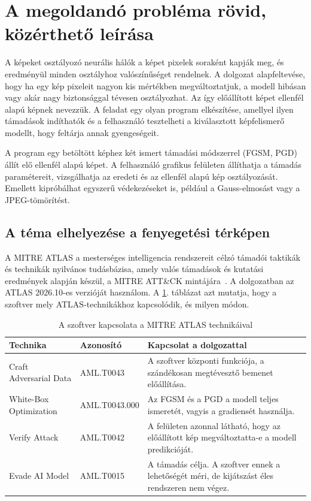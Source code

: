 \section{A megoldandó probléma rövid, közérthető leírása}
A képeket osztályozó neurális hálók a képet pixelek soraként kapják meg, és eredményül minden osztályhoz valószínűséget rendelnek. 
A dolgozat alapfeltevése, hogy ha egy kép pixeleit nagyon kis mértékben megváltoztatjuk, a modell hibásan vagy akár nagy 
biztonsággal tévesen osztályozhat. 
Az így előállított képet ellenfél alapú képnek nevezzük. 
A feladat egy olyan program elkészítése, amellyel ilyen támadások indíthatók és a felhasználó tesztelheti a kiválasztott 
képfelismerő modellt, hogy feltárja annak gyengeségeit. 

A program egy betöltött képhez két ismert támadási módszerrel (FGSM, PGD) állít elő ellenfél alapú képet. 
A felhasználó grafikus felületen állíthatja a támadás paramétereit, vizsgálhatja az eredeti és az ellenfél alapú kép 
osztályozását. 
Emellett kipróbálhat egyszerű védekezéseket is, például a Gauss-elmosást vagy a JPEG-tömörítést. 

\subsection{A téma elhelyezése a fenyegetési térképen}
A MITRE ATLAS a mesterséges intelligencia rendszereit célzó támadói taktikák és technikák nyilvános tudásbázisa, amely 
valós támadások és kutatási eredmények alapján készül, a MITRE ATT\&CK mintájára~\cite{mitre2026atlas}. 
A dolgozatban az ATLAS 2026.10-es verzióját használom. 
A \ref{tab:atlas}. táblázat azt mutatja, hogy a szoftver mely ATLAS-technikákhoz kapcsolódik, és milyen módon. 

\begin{table}[htb]
\centering
\begin{tabular}{|p{3cm}|p{2.9cm}|p{7.6cm}|}
\hline
\textbf{Technika} & \textbf{Azonosító} & \textbf{Kapcsolat a dolgozattal} \\
\hline
Craft Adversarial Data & AML.T0043 & A szoftver központi funkciója, a szándékosan megtévesztő bemenet előállítása. \\
\hline
White-Box Optimization & AML.T0043.000 & Az FGSM és a PGD a modell teljes ismeretét, vagyis a gradiensét használja. \\
\hline
Verify Attack & AML.T0042 & A felületen azonnal látható, hogy az előállított kép megváltoztatta-e a modell predikcióját. \\
\hline
Evade AI Model & AML.T0015 & A támadás célja. A szoftver ennek a lehetőségét méri, de kijátszást éles rendszeren nem végez. \\
\hline
\end{tabular}
\caption{A szoftver kapcsolata a MITRE ATLAS technikáival}
\label{tab:atlas}
\end{table}

